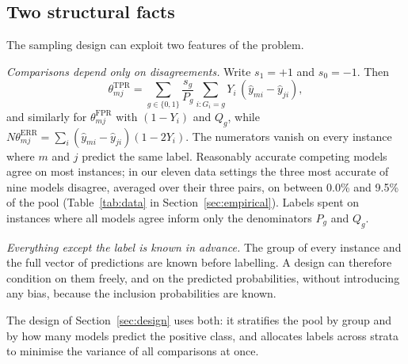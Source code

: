 \subsection{Two structural facts}
The sampling design can exploit two features of the problem.

\emph{Comparisons depend only on disagreements.} Write $s_1=+1$ and $s_0=-1$. Then
\begin{equation}\label{eq:identity}
\theta^{\mathrm{TPR}}_{mj}=\sum_{g\in\{0,1\}} \frac{s_g}{P_g}\sum_{i:G_i=g} Y_i\,(\hat y_{mi}-\hat y_{ji}),
\end{equation}
and similarly for $\theta^{\mathrm{FPR}}_{mj}$ with $(1-Y_i)$ and $Q_g$, while $N\theta^{\mathrm{ERR}}_{mj}=\sum_i(\hat y_{mi}-\hat y_{ji})(1-2Y_i)$. The numerators vanish on every instance where $m$ and $j$ predict the same label. Reasonably accurate competing models agree on most instances; in our eleven data settings the three most accurate of nine models disagree, averaged over their three pairs, on between 0.0\% and 9.5\% of the pool (Table~\ref{tab:data} in Section~\ref{sec:empirical}). Labels spent on instances where all models agree inform only the denominators $P_g$ and $Q_g$.

\emph{Everything except the label is known in advance.} The group of every instance and the full vector of predictions are known before labelling. A design can therefore condition on them freely, and on the predicted probabilities, without introducing any bias, because the inclusion probabilities are known.

The design of Section~\ref{sec:design} uses both: it stratifies the pool by group and by how many models predict the positive class, and allocates labels across strata to minimise the variance of all comparisons at once.

